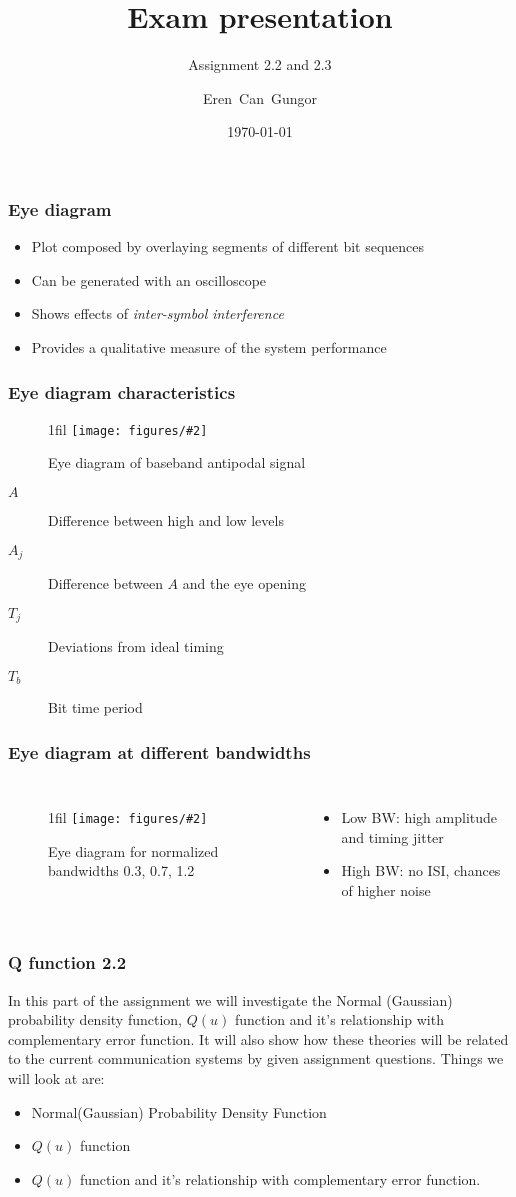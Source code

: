 \documentclass{beamer}
\title{Exam presentation}
\subtitle{Assignment 2.2 and 2.3}
\author[Eren]{Eren~Can~Gungor\inst{1}}
\institute[DTU]
{
	\inst{1}
	Technical University of Denmark\\
	Digital Communication
}
\date{\today}
\makeatletter
\newcommand*{\centerfloat}{%
  \parindent \z@
  \leftskip \z@ \@plus 1fil \@minus \textwidth
  \rightskip\leftskip
  \parfillskip \z@skip}
\newcommand{\fig}[3]{
  \begin{figure}[H]
  \centerfloat
    \texttt{[image: figures/\#2]}
    \caption{#3}
  \end{figure}
}
\makeatother
\begin{document}
\frame{\titlepage}

\begin{frame}
	\frametitle{Eye diagram}
	\begin{itemize}
		\item Plot composed by overlaying segments of different bit sequences
		\item Can be generated with an oscilloscope
		\item Shows effects of \emph{inter-symbol interference}
		\item Provides a qualitative measure of the system performance
	\end{itemize}
\end{frame}

\begin{frame}
	\frametitle{Eye diagram characteristics}
	\fig{9cm}{eye1.png}{Eye diagram of baseband antipodal signal}
	\begin{description}
		\item[$A$] Difference between high and low levels
		\item[$A_j$] Difference between $A$ and the eye opening
		\item[$T_j$] Deviations from ideal timing
		\item[$T_b$] Bit time period
	\end{description}
\end{frame}

\begin{frame}
	\frametitle{Eye diagram at different bandwidths}
	\begin{columns}
			\fig{8cm}{eye2.png}{Eye diagram for normalized bandwidths 0.3, 0.7, 1.2}
			\begin{itemize}
				\item Low BW: high amplitude and timing jitter
				\item High BW: no ISI, chances of higher noise
			\end{itemize}
	\end{columns}
\end{frame}

\begin{frame}
	\frametitle{ Q function 2.2}
In this part of the assignment we will investigate the  Normal (Gaussian) probability density function, $Q(u)$ function and it's relationship with complementary error function. It will also show how these theories will be related to the current communication systems by given assignment questions. Things we will look at are:

	\begin{itemize}
		\item Normal(Gaussian) Probability Density Function
		\item $Q(u)$ function
		\item $Q(u)$ function and it's relationship with complementary error function.
	\end{itemize}
\end{frame}
\end{document}

